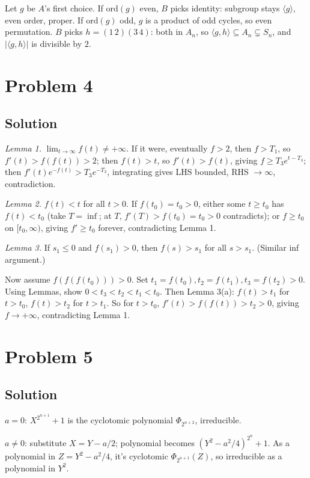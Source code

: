 \documentclass{article}
\begin{document}
Let $g$ be $A$'s first choice. If $\mathrm{ord}(g)$ even, $B$ picks identity: subgroup stays $\langle g \rangle$, even order, proper. If $\mathrm{ord}(g)$ odd, $g$ is a product of odd cycles, so even permutation. $B$ picks $h = (1\,2)(3\,4)$: both in $A_n$, so $\langle g, h \rangle \subseteq A_n \subsetneq S_n$, and $|\langle g, h\rangle|$ is divisible by $2$.

\section*{Problem 4}
\subsection*{Solution}
\emph{Lemma 1.} $\lim_{t \to \infty} f(t) \ne +\infty$. If it were, eventually $f > 2$, then $f > T_1$, so $f'(t) > f(f(t)) > 2$; then $f(t) > t$, so $f'(t) > f(t)$, giving $f \ge T_3 e^{t-T_3}$; then $f'(t) e^{-f(t)} > T_3 e^{-T_3}$, integrating gives LHS bounded, RHS $\to \infty$, contradiction.

\emph{Lemma 2.} $f(t) < t$ for all $t > 0$. If $f(t_0) = t_0 > 0$, either some $t \ge t_0$ has $f(t) < t_0$ (take $T = \inf$; at $T$, $f'(T) > f(t_0) = t_0 > 0$ contradicts); or $f \ge t_0$ on $[t_0, \infty)$, giving $f' \ge t_0$ forever, contradicting Lemma 1.

\emph{Lemma 3.} If $s_1 \le 0$ and $f(s_1) > 0$, then $f(s) > s_1$ for all $s > s_1$. (Similar inf argument.)

Now assume $f(f(f(t_0))) > 0$. Set $t_1 = f(t_0), t_2 = f(t_1), t_3 = f(t_2) > 0$. Using Lemmas, show $0 < t_3 < t_2 < t_1 < t_0$. Then Lemma 3(a): $f(t) > t_1$ for $t > t_0$, $f(t) > t_2$ for $t > t_1$. So for $t > t_0$, $f'(t) > f(f(t)) > t_2 > 0$, giving $f \to +\infty$, contradicting Lemma 1.

\section*{Problem 5}
\subsection*{Solution}
$a = 0$: $X^{2^{n+1}} + 1$ is the cyclotomic polynomial $\Phi_{2^{n+2}}$, irreducible.

$a \ne 0$: substitute $X = Y - a/2$; polynomial becomes $(Y^2 - a^2/4)^{2^n} + 1$. As a polynomial in $Z = Y^2 - a^2/4$, it's cyclotomic $\Phi_{2^{n+1}}(Z)$, so irreducible as a polynomial in $Y^2$.
\end{document}
